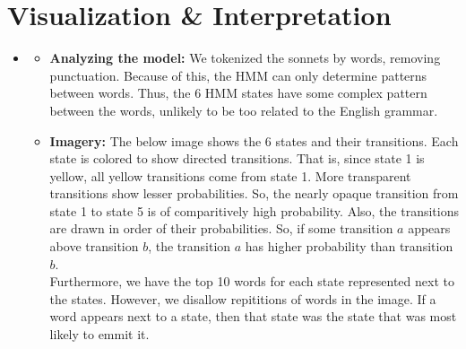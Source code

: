 \section{Visualization \& Interpretation}
\medskip
\begin{itemize}


    \item {}

    \begin{itemize}
    \item \textbf{Analyzing the model:}
        We tokenized the sonnets by words, removing punctuation. Because of
        this, the HMM can only determine patterns between words. Thus,
        the 6 HMM states have some complex pattern between the words,
        unlikely to be too related to the English grammar. \\
    \item \textbf{Imagery:}
        The below image shows the 6 states and their transitions. Each state
        is colored to show directed transitions. That is, since state 1 is
        yellow, all yellow transitions come from state 1. More transparent
        transitions show lesser probabilities. So, the nearly opaque transition
        from state 1 to state 5 is of comparitively high probability. Also,
        the transitions are drawn in order of their probabilities. So, if
        some transition $a$ appears above transition $b$, the transition $a$
        has higher probability than transition $b$. \\

        Furthermore, we have the top 10 words for each state represented
        next to the states. However, we disallow repititions of words in
        the image. If a word appears next to a state, then that state was
        the state that was most likely to emmit it.
    \end{itemize}


\end{itemize}
